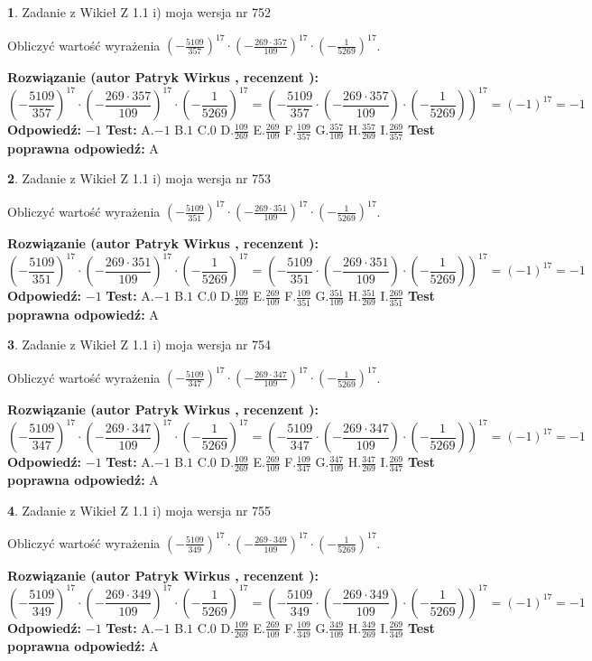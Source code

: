 \documentclass[12pt, a4paper]{article}
\theoremstyle{definition} %
\newtheorem{zad}{}
\newcommand{\zadStart}[1]{\begin{zad}#1\newline}
\newcommand{\zadStop}{\end{zad}}
\newcommand{\rozwStart}[2]{\noindent \textbf{Rozwiązanie (autor #1 , recenzent #2): }\newline}
\newcommand{\rozwStop}{\newline}
\newcommand{\odpStart}{\noindent \textbf{Odpowiedź:}\newline}
\newcommand{\odpStop}{\newline}
\newcommand{\testStart}{\noindent \textbf{Test:}\newline}
\newcommand{\testStop}{\newline}
\newcommand{\kluczStart}{\noindent \textbf{Test poprawna odpowiedź:}\newline}
\newcommand{\kluczStop}{\newline}
\begin{document}
\zadStart{Zadanie z Wikieł Z 1.1 i) moja wersja nr 752}

Obliczyć wartość wyrażenia $(-\frac{5109}{357})^{17} \cdot (-\frac{269 \cdot 357}{109})^{17} \cdot (-\frac{1}{5269})^{17}$.
\zadStop
\rozwStart{Patryk Wirkus}{}
$$(-\frac{5109}{357})^{17} \cdot (-\frac{269 \cdot 357}{109})^{17} \cdot (-\frac{1}{5269})^{17} = (-\frac{5109}{357} \cdot (-\frac{269 \cdot 357}{109}) \cdot (-\frac{1}{5269}))^{17} = (-1)^{17} = -1$$
\rozwStop
\odpStart
$-1$
\odpStop
\testStart
A.$-1$ B.$1$ C.$0$ D.$\frac{109}{269}$ E.$\frac{269}{109}$
F.$\frac{109}{357}$ G.$\frac{357}{109}$
H.$\frac{357}{269}$
I.$\frac{269}{357}$
\testStop
\kluczStart
A
\kluczStop



\zadStart{Zadanie z Wikieł Z 1.1 i) moja wersja nr 753}

Obliczyć wartość wyrażenia $(-\frac{5109}{351})^{17} \cdot (-\frac{269 \cdot 351}{109})^{17} \cdot (-\frac{1}{5269})^{17}$.
\zadStop
\rozwStart{Patryk Wirkus}{}
$$(-\frac{5109}{351})^{17} \cdot (-\frac{269 \cdot 351}{109})^{17} \cdot (-\frac{1}{5269})^{17} = (-\frac{5109}{351} \cdot (-\frac{269 \cdot 351}{109}) \cdot (-\frac{1}{5269}))^{17} = (-1)^{17} = -1$$
\rozwStop
\odpStart
$-1$
\odpStop
\testStart
A.$-1$ B.$1$ C.$0$ D.$\frac{109}{269}$ E.$\frac{269}{109}$
F.$\frac{109}{351}$ G.$\frac{351}{109}$
H.$\frac{351}{269}$
I.$\frac{269}{351}$
\testStop
\kluczStart
A
\kluczStop



\zadStart{Zadanie z Wikieł Z 1.1 i) moja wersja nr 754}

Obliczyć wartość wyrażenia $(-\frac{5109}{347})^{17} \cdot (-\frac{269 \cdot 347}{109})^{17} \cdot (-\frac{1}{5269})^{17}$.
\zadStop
\rozwStart{Patryk Wirkus}{}
$$(-\frac{5109}{347})^{17} \cdot (-\frac{269 \cdot 347}{109})^{17} \cdot (-\frac{1}{5269})^{17} = (-\frac{5109}{347} \cdot (-\frac{269 \cdot 347}{109}) \cdot (-\frac{1}{5269}))^{17} = (-1)^{17} = -1$$
\rozwStop
\odpStart
$-1$
\odpStop
\testStart
A.$-1$ B.$1$ C.$0$ D.$\frac{109}{269}$ E.$\frac{269}{109}$
F.$\frac{109}{347}$ G.$\frac{347}{109}$
H.$\frac{347}{269}$
I.$\frac{269}{347}$
\testStop
\kluczStart
A
\kluczStop



\zadStart{Zadanie z Wikieł Z 1.1 i) moja wersja nr 755}

Obliczyć wartość wyrażenia $(-\frac{5109}{349})^{17} \cdot (-\frac{269 \cdot 349}{109})^{17} \cdot (-\frac{1}{5269})^{17}$.
\zadStop
\rozwStart{Patryk Wirkus}{}
$$(-\frac{5109}{349})^{17} \cdot (-\frac{269 \cdot 349}{109})^{17} \cdot (-\frac{1}{5269})^{17} = (-\frac{5109}{349} \cdot (-\frac{269 \cdot 349}{109}) \cdot (-\frac{1}{5269}))^{17} = (-1)^{17} = -1$$
\rozwStop
\odpStart
$-1$
\odpStop
\testStart
A.$-1$ B.$1$ C.$0$ D.$\frac{109}{269}$ E.$\frac{269}{109}$
F.$\frac{109}{349}$ G.$\frac{349}{109}$
H.$\frac{349}{269}$
I.$\frac{269}{349}$
\testStop
\kluczStart
A
\kluczStop
\end{document}
